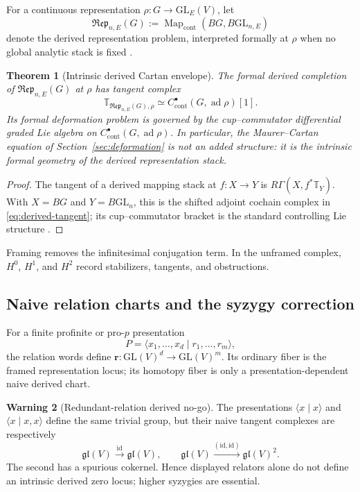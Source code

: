 \documentclass[11pt]{article}
\newtheorem{theorem}{Theorem}[section]
\theoremstyle{definition}
\newtheorem{warning}[theorem]{Warning}
\begin{document}
For a continuous representation $\rho:G\to\mathrm{GL}_E(V)$, let
\[
\mathfrak{Rep}_{n,E}(G):=\operatorname{Map}_{\mathrm{cont}}(BG,B\mathrm{GL}_{n,E})
\]
denote the derived representation problem, interpreted formally at $\rho$ when no global analytic stack is fixed \cite{GalatiusVenkatesh,AntonioPadic,AntonioProEtale}.

\begin{theorem}[Intrinsic derived Cartan envelope]\label{thm:derived-envelope}
The formal derived completion of $\mathfrak{Rep}_{n,E}(G)$ at $\rho$ has tangent complex
\begin{equation}\label{eq:derived-tangent}
\mathbb T_{\mathfrak{Rep}_{n,E}(G),\rho}
\simeq
C^\bullet_{\mathrm{cont}}(G,\operatorname{ad}\rho)[1].
\end{equation}
Its formal deformation problem is governed by the cup--commutator differential graded Lie algebra on $C^\bullet_{\mathrm{cont}}(G,\operatorname{ad}\rho)$.  In particular, the Maurer--Cartan equation of Section~\ref{sec:deformation} is not an added structure: it is the intrinsic formal geometry of the derived representation stack.
\end{theorem}

\begin{proof}
The tangent of a derived mapping stack at $f:X\to Y$ is $R\Gamma(X,f^*\mathbb T_Y)$.  With $X=BG$ and $Y=B\mathrm{GL}_n$, this is the shifted adjoint cochain complex in \eqref{eq:derived-tangent}; its cup--commutator bracket is the standard controlling Lie structure \cite{GalatiusVenkatesh,AntonioPadic}.
\end{proof}

Framing removes the infinitesimal conjugation term.  In the unframed complex, $H^0$, $H^1$, and $H^2$ record stabilizers, tangents, and obstructions.

\subsection{Naive relation charts and the syzygy correction}

For a finite profinite or pro-$p$ presentation
\[
P=\langle x_1,\ldots,x_d\mid r_1,\ldots,r_m\rangle,
\]
the relation words define $\mathbf r:\mathrm{GL}(V)^d\to\mathrm{GL}(V)^m$.  Its ordinary fiber is the framed representation locus; its homotopy fiber is only a presentation-dependent naive derived chart.

\begin{warning}[Redundant-relation derived no-go]\label{warn:redundant-derived}
The presentations $\langle x\mid x\rangle$ and $\langle x\mid x,x\rangle$ define the same trivial group, but their naive tangent complexes are respectively
\[
\mathfrak{gl}(V)\xrightarrow{\mathrm{id}}\mathfrak{gl}(V),
\qquad
\mathfrak{gl}(V)\xrightarrow{(\mathrm{id},\mathrm{id})}\mathfrak{gl}(V)^2.
\]
The second has a spurious cokernel.  Hence displayed relators alone do not define an intrinsic derived zero locus; higher syzygies are essential.
\end{warning}
\end{document}
